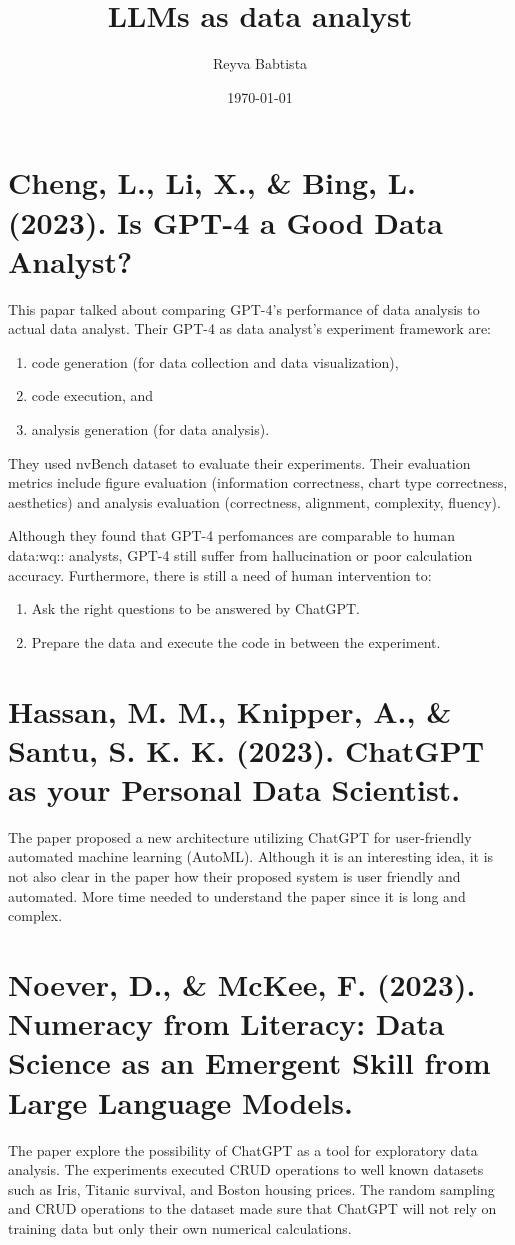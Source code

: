 \documentclass[11pt]{article}
\author{Reyva Babtista}
\date{\today}
\title{LLMs as data analyst}
\begin{document}
\maketitle

\section{Cheng, L., Li, X., \& Bing, L. (2023). Is GPT-4 a Good Data Analyst?}
\label{sec:org505ce83}
This papar talked about comparing GPT-4's
performance of data analysis to actual data analyst. Their GPT-4 as data
analyst's experiment framework are:
\begin{enumerate}
\item code generation (for data collection and data visualization),
\item code execution, and
\item analysis generation (for data analysis).
\end{enumerate}
They used nvBench dataset to evaluate their experiments. Their evaluation
metrics include figure evaluation (information correctness, chart type
correctness, aesthetics) and analysis evaluation (correctness, alignment,
complexity, fluency).

Although they found that GPT-4 perfomances are comparable to human data:wq::
analysts, GPT-4 still suffer from hallucination or poor calculation accuracy.
Furthermore, there is still a need of human intervention to:
\begin{enumerate}
\item Ask the right questions to be answered by ChatGPT.
\item Prepare the data and execute the code in between the experiment.
\end{enumerate}

\section{Hassan, M. M., Knipper, A., \& Santu, S. K. K. (2023). ChatGPT as your Personal Data Scientist.}
\label{sec:org29348f7}
The paper proposed a new architecture utilizing ChatGPT for user-friendly
automated machine learning (AutoML). Although it is an interesting idea, it is
not also clear in the paper how their proposed system is user friendly and
automated. More time needed to understand the paper since it is long and
complex.

\section{Noever, D., \& McKee, F. (2023). Numeracy from Literacy: Data Science as an Emergent Skill from Large Language Models.}
\label{sec:org1500ca1}
The paper explore the possibility of ChatGPT as a tool for exploratory data
analysis. The experiments executed CRUD operations to well known datasets such
as Iris, Titanic survival, and Boston housing prices. The random sampling and
CRUD operations to the dataset made sure that ChatGPT will not rely on training
data but only their own numerical calculations.
\end{document}
